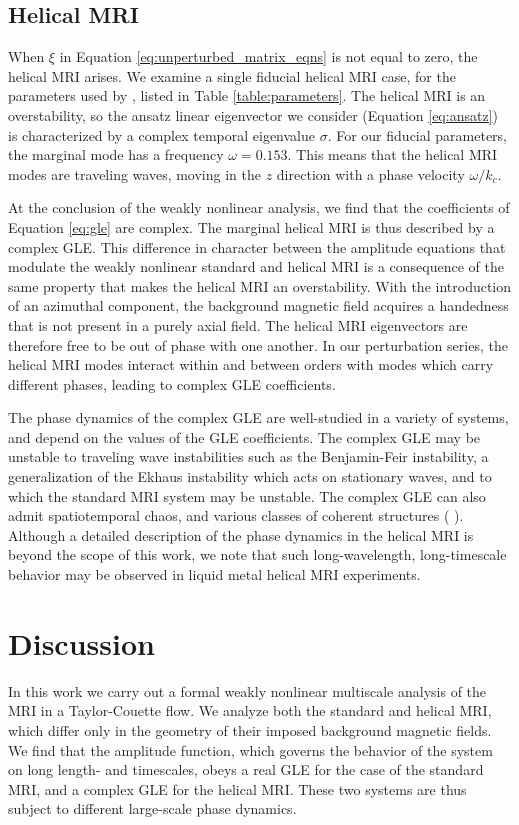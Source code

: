 \documentclass{emulateapj}
\newcommand{\citei}[1]{\citeauthor{#1} \citeyear{#1}}
\begin{document}
\subsection{Helical MRI}
When $\xi$ in Equation \ref{eq:unperturbed_matrix_eqns} is not equal to zero, the helical MRI arises. We examine a single fiducial helical MRI case, for the parameters used by \citei{Hollerbach:2005tr}, listed in Table \ref{table:parameters}. The helical MRI is an overstability, so the ansatz linear eigenvector we consider (Equation \ref{eq:ansatz}) is characterized by a complex temporal eigenvalue $\sigma$. For our fiducial parameters, the marginal mode has a frequency $\omega = 0.153$. This means that the helical MRI modes are traveling waves, moving in the $z$ direction with a phase velocity $\omega/k_c$.

At the conclusion of the weakly nonlinear analysis, we find that the coefficients of Equation \ref{eq:gle} are complex. The marginal helical MRI is thus described by a complex GLE. This difference in character between the amplitude equations that modulate the weakly nonlinear standard and helical MRI is a consequence of the same property that makes the helical MRI an overstability. With the introduction of an azimuthal component, the background magnetic field acquires a handedness that is not present in a purely axial field. The helical MRI eigenvectors are therefore free to be out of phase with one another. In our perturbation series, the helical MRI modes interact within and between orders with modes which carry different phases, leading to complex GLE coefficients.

The phase dynamics of the complex GLE are well-studied in a variety of systems, and depend on the values of the GLE coefficients. The complex GLE may be unstable to traveling wave instabilities such as the Benjamin-Feir instability, a generalization of the Ekhaus instability which acts on stationary waves, and to which the standard MRI system may be unstable. The complex GLE can also admit spatiotemporal chaos, and various classes of coherent structures (\citei{Aranson:2002}).
Although a detailed description of the phase dynamics in the helical MRI is beyond the scope of this work, we note that such long-wavelength, long-timescale behavior may be observed in liquid metal helical MRI experiments. 

\section{Discussion}
\label{sec:discussion}
In this work we carry out a formal weakly nonlinear multiscale analysis of the MRI in a Taylor-Couette flow. We analyze both the standard and helical MRI, which differ only in the geometry of their imposed background magnetic fields. We find that the amplitude function, which governs the behavior of the system on long length- and timescales, obeys a real GLE for the case of the standard MRI, and a complex GLE for the helical MRI. These two systems are thus subject to different large-scale phase dynamics. 
\end{document}
